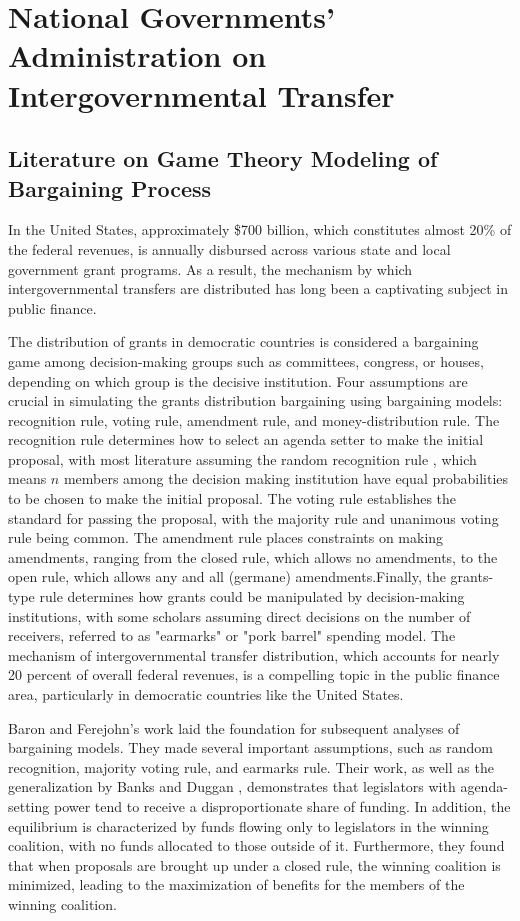 \chapter{National Governments' Administration on Intergovernmental Transfer}

\section{Literature on Game Theory Modeling of Bargaining Process}

In the United States, approximately \$700 billion, which constitutes almost 20\% of the federal revenues, is annually disbursed across various state and local government grant programs. As a result, the mechanism by which intergovernmental transfers are distributed has long been a captivating subject in public finance.

The distribution of grants in democratic countries is considered a bargaining game among decision-making groups such as committees, congress, or houses, depending on which group is the decisive institution.  Four assumptions are crucial in simulating the grants distribution bargaining using bargaining models: recognition rule, voting rule, amendment rule, and money-distribution rule. The recognition rule determines how to select an agenda setter to make the initial proposal, with most literature assuming the random recognition rule \cite{kalandrakis2004three,anesi2015bargaining,diermeier2011legislative,rosenstiel2021congressional}, which means $n$ members among the decision making institution have equal probabilities to be chosen to make the initial proposal. The voting rule establishes the standard for passing the proposal, with the majority rule and unanimous voting rule being common. The amendment rule places constraints on making amendments, ranging from the closed rule, which allows no amendments, to the open rule, which allows any and all (germane) amendments.Finally, the grants-type rule determines how grants could be manipulated by decision-making institutions, with some scholars assuming direct decisions on the number of receivers, referred to as "earmarks" or "pork barrel" spending model. The mechanism of intergovernmental transfer distribution, which accounts for nearly 20 percent of overall federal revenues, is a compelling topic in the public finance area, particularly in democratic countries like the United States.

Baron and Ferejohn's work \cite{baron1989bargaining} laid the foundation for subsequent analyses of bargaining models. They made several important assumptions, such as random recognition, majority voting rule, and earmarks rule. Their work, as well as the generalization by Banks and Duggan \cite{banks2006general}, demonstrates that legislators with agenda-setting power tend to receive a disproportionate share of funding. In addition, the equilibrium is characterized by funds flowing only to legislators in the winning coalition, with no funds allocated to those outside of it. Furthermore, they found that when proposals are brought up under a closed rule, the winning coalition is minimized, leading to the maximization of benefits for the members of the winning coalition.

